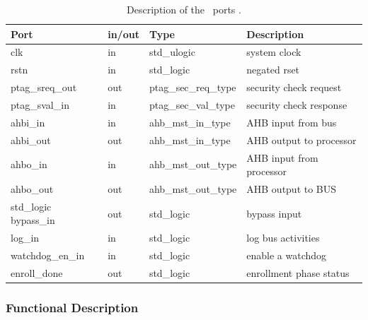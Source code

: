 \begin{table}[H]
\begin{tabular}{l l l l}
\textbf{Port}   & \textbf{in/out} & \textbf{Type}        & \textbf{Description} 	\\ \hline \hline
clk             & in              & std\_ulogic          & system clock         	\\ \hline
rstn            & in              & std\_logic           & negated rset         	\\ \hline
ptag\_sreq\_out & out             & ptag\_sec\_req\_type & security check request    	\\ \hline
ptag\_sval\_in  & in              & ptag\_sec\_val\_type & security check response  	\\ \hline
ahbi\_in        & in              & ahb\_mst\_in\_type   & AHB input from bus      	\\ \hline
ahbi\_out       & out             & ahb\_mst\_in\_type   & AHB output to processor      \\ \hline
ahbo\_in        & in              & ahb\_mst\_out\_type  & AHB input from processor    \\ \hline
ahbo\_out       & out             & ahb\_mst\_out\_type  & AHB output to BUS            \\ \hline
std\_logic         
bypass\_in      & out             & std\_logic           & bypass input         	\\ \hline
log\_in         & in              & std\_logic           & log bus activities       \\ \hline
watchdog\_en\_in  & in            & std\_logic           & enable a watchdog             \\ \hline
enroll\_done     & out             & std\_logic          & enrollment phase status            \\ \hline

\end{tabular}
 \caption{Description of the \handler~ports .}
 \label{table:shports}

\end{table}

\subsubsection{Functional Description}

